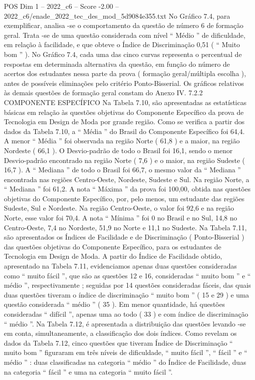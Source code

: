 \begin{textsample}{POS Dim 1 – 2022\_c6 – Score -2.00 – 2022\_c6/enade\_2022\_tec\_des\_mod\_5d9084e355.txt}
No Gráfico 7.4, para exemplificar, analisa -se o comportamento da questão de número 6 de formação geral.
Trata -se de uma questão considerada com nível “ Médio ” de dificuldade, em relação à facilidade, e que obteve o Índice de Discriminação 0,51 ( “ Muito bom ” ).
No Gráfico 7.4, cada uma das cinco curvas representa o percentual de respostas em determinada alternativa da questão, em função do número de acertos dos estudantes nessa parte da prova ( formação geral/múltipla escolha ), antes de possíveis eliminações pelo critério Ponto-Bisserial.
Os gráficos relativos às demais questões de formação geral constam do Anexo IV. 7.2.2 COMPONENTE ESPECÍFICO Na Tabela 7.10, são apresentadas as estatísticas básicas em relação às questões objetivas do Componente Específico da prova de Tecnologia em Design de Moda por grande região.
Como se verifica a partir dos dados da Tabela 7.10, a “ Média ” do Brasil do Componente Específico foi 64,4.
A menor “ Média ” foi observada na região Norte ( 61,8 ) e a maior, na região Nordeste ( 66,1 ).
O Desvio-padrão de todo o Brasil foi 16,1, sendo o menor Desvio-padrão encontrado na região Norte ( 7,6 ) e o maior, na região Sudeste ( 16,7 ).
A “ Mediana ” de todo o Brasil foi 66,7, o mesmo valor da “ Mediana ” encontrada nas regiões Centro-Oeste, Nordeste, Sudeste e Sul.
Na região Norte, a “ Mediana ” foi 61,2.
A nota “ Máxima ” da prova foi 100,00, obtida nas questões objetivas do Componente Específico, por, pelo menos, um estudante das regiões Sudeste, Sul e Nordeste.
Na região Centro-Oeste, o valor foi 92,6 e na região Norte, esse valor foi 70,4.
A nota “ Mínima ” foi 0 no Brasil e no Sul, 14,8 no Centro-Oeste, 7,4 no Nordeste, 51,9 no Norte e 11,1 no Sudeste.
Na Tabela 7.11, são apresentados os Índices de Facilidade e de Discriminação ( Ponto-Bisserial ) das questões objetivas do Componente Específico, para os estudantes de Tecnologia em Design de Moda.
A partir do Índice de Facilidade obtido, apresentado na Tabela 7.11, evidenciamos apenas duas questões consideradas como “ muito fácil ”, que são as questões 12 e 16, consideradas “ muito bom ” e “ médio ”, respectivamente ; seguidas por 14 questões consideradas fáceis, das quais duas questões tiveram o índice de discriminação “ muito bom ” ( 15 e 29 ) e uma questão considerada “ médio ” ( 35 ).
Em menor quantidade, há questões consideradas “ difícil ”, apenas uma ao todo ( 33 ) e com índice de discriminação “ médio ”.
Na Tabela 7.12, é apresentada a distribuição das questões levando -se em conta, simultaneamente, a classificação dos dois índices.
Como revelam os dados da Tabela 7.12, cinco questões que tiveram Índice de Discriminação “ muito bom ” figuraram em três níveis de dificuldade, “ muito fácil ”, “ fácil ” e “ médio ” : duas classificadas na categoria “ médio ” do Índice de Facilidade, duas na categoria “ fácil ” e uma na categoria “ muito fácil ”.

\end{textsample}
